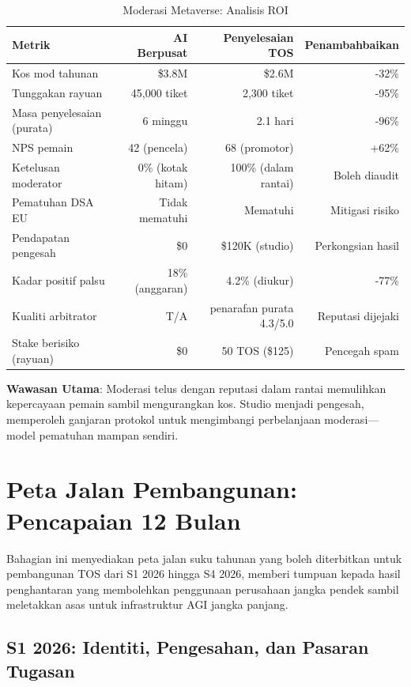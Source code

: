 \documentclass[11pt]{article}
\begin{document}
\begin{table}[H]
\centering
\caption{Moderasi Metaverse: Analisis ROI}
\label{tab:metaverse-roi}
\begin{tabular}{@{}lrrr@{}}
\toprule
\textbf{Metrik} & \textbf{AI Berpusat} & \textbf{Penyelesaian TOS} & \textbf{Penambahbaikan} \\ \midrule
Kos mod tahunan & \$3.8M & \$2.6M & -32\% \\
Tunggakan rayuan & 45,000 tiket & 2,300 tiket & -95\% \\
Masa penyelesaian (purata) & 6 minggu & 2.1 hari & -96\% \\
NPS pemain & 42 (pencela) & 68 (promotor) & +62\% \\
Ketelusan moderator & 0\% (kotak hitam) & 100\% (dalam rantai) & Boleh diaudit \\
Pematuhan DSA EU & Tidak mematuhi & Mematuhi & Mitigasi risiko \\
Pendapatan pengesah & \$0 & \$120K (studio) & Perkongsian hasil \\
Kadar positif palsu & 18\% (anggaran) & 4.2\% (diukur) & -77\% \\
Kualiti arbitrator & T/A & penarafan purata 4.3/5.0 & Reputasi dijejaki \\
Stake berisiko (rayuan) & \$0 & 50 TOS (\$125) & Pencegah spam \\
\bottomrule
\end{tabular}
\end{table}

\textbf{Wawasan Utama}: Moderasi telus dengan reputasi dalam rantai memulihkan kepercayaan pemain sambil mengurangkan kos. Studio menjadi pengesah, memperoleh ganjaran protokol untuk mengimbangi perbelanjaan moderasi—model pematuhan mampan sendiri.

\section{Peta Jalan Pembangunan: Pencapaian 12 Bulan}
\label{sec:12month-roadmap}

Bahagian ini menyediakan peta jalan suku tahunan yang boleh diterbitkan untuk pembangunan TOS dari S1 2026 hingga S4 2026, memberi tumpuan kepada hasil penghantaran yang membolehkan penggunaan perusahaan jangka pendek sambil meletakkan asas untuk infrastruktur AGI jangka panjang.

\subsection{S1 2026: Identiti, Pengesahan, dan Pasaran Tugasan}
\end{document}
